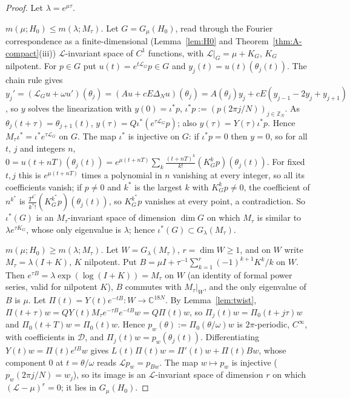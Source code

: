 \documentclass[11pt]{article}
\theoremstyle{definition}
\newcommand{\C}{\mathbb{C}}
\newcommand{\Z}{\mathbb{Z}}
\newcommand{\Dsp}{\mathcal{D}}
\newcommand{\Lop}{\mathcal{L}}
\begin{document}
\begin{proof}
Let $\lambda = e^{\mu\tau}$.

\emph{$m(\mu; H_0) \le m(\lambda; M_\tau)$.} Let $G = G_\mu(H_0)$, read through the Fourier correspondence as a finite-dimensional (Lemma~\ref{lem:H0} and Theorem~\ref{thm:A-compact}(iii)) $\Lop$-invariant space of $C^1$ functions, with $\Lop|_G = \mu + K_G$, $K_G$ nilpotent. For $p \in G$ put $u(t) = e^{t\Lop_G}p \in G$ and $y_j(t) = u(t)(\theta_j(t))$. The chain rule gives $y_j' = (\Lop_Gu + \omega u')(\theta_j) = (Au + cE\Delta_Nu)(\theta_j) = A(\theta_j)y_j + cE(y_{j-1} - 2y_j + y_{j+1})$, so $y$ solves the linearization with $y(0) = \iota^*p$, $\iota^*p := (p(2\pi j/N))_{j\in\Z_N}$. As $\theta_j(t + \tau) = \theta_{j+1}(t)$, $y(\tau) = Q\iota^*(e^{\tau\Lop_G}p)$; also $y(\tau) = Y(\tau)\iota^*p$. Hence $M_\tau\iota^* = \iota^*e^{\tau\Lop_G}$ on $G$. The map $\iota^*$ is injective on $G$: if $\iota^*p = 0$ then $y = 0$, so for all $t$, $j$ and integers $n$, $0 = u(t + nT)(\theta_j(t)) = e^{\mu(t+nT)}\sum_k\frac{(t+nT)^k}{k!}(K_G^kp)(\theta_j(t))$. For fixed $t, j$ this is $e^{\mu(t+nT)}$ times a polynomial in $n$ vanishing at every integer, so all its coefficients vanish; if $p \ne 0$ and $k^*$ is the largest $k$ with $K_G^kp \ne 0$, the coefficient of $n^{k^*}$ is $\frac{T^{k^*}}{k^*!}(K_G^{k^*}p)(\theta_j(t))$, so $K_G^{k^*}p$ vanishes at every point, a contradiction. So $\iota^*(G)$ is an $M_\tau$-invariant space of dimension $\dim G$ on which $M_\tau$ is similar to $\lambda e^{\tau K_G}$, whose only eigenvalue is $\lambda$; hence $\iota^*(G) \subset G_\lambda(M_\tau)$.

\emph{$m(\mu; H_0) \ge m(\lambda; M_\tau)$.} Let $W = G_\lambda(M_\tau)$, $r = \dim W \ge 1$, and on $W$ write $M_\tau = \lambda(I + K)$, $K$ nilpotent. Put $B = \mu I + \tau^{-1}\sum_{k=1}^r(-1)^{k+1}K^k/k$ on $W$. Then $e^{\tau B} = \lambda\exp(\log(I + K)) = M_\tau$ on $W$ (an identity of formal power series, valid for nilpotent $K$), $B$ commutes with $M_\tau|_W$, and the only eigenvalue of $B$ is $\mu$. Let $\Pi(t) = Y(t)e^{-tB}: W \to \C^{18N}$. By Lemma~\ref{lem:twist}, $\Pi(t + \tau)w = QY(t)M_\tau e^{-\tau B}e^{-tB}w = Q\Pi(t)w$, so $\Pi_j(t)w = \Pi_0(t + j\tau)w$ and $\Pi_0(t + T)w = \Pi_0(t)w$. Hence $p_w(\theta) := \Pi_0(\theta/\omega)w$ is $2\pi$-periodic, $C^\infty$, with coefficients in $\Dsp$, and $\Pi_j(t)w = p_w(\theta_j(t))$. Differentiating $Y(t)w = \Pi(t)e^{tB}w$ gives $L(t)\Pi(t)w = \Pi'(t)w + \Pi(t)Bw$, whose component $0$ at $t = \theta/\omega$ reads $\Lop p_w = p_{Bw}$. The map $w \mapsto p_w$ is injective ($p_w(2\pi j/N) = w_j$), so its image is an $\Lop$-invariant space of dimension $r$ on which $(\Lop - \mu)^r = 0$; it lies in $G_\mu(H_0)$.
\end{proof}
\end{document}
